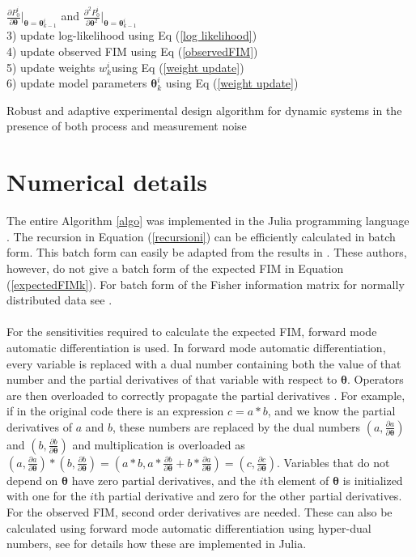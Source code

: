 \begin{algorithm}[H]
{{			$\frac{\partial P_0^i}{\partial \bm \theta}\Bigr|_{\bm \theta = \bm \theta_{k-1}^i}$ and
			$\frac{\partial^2 P_0^i}{\partial \bm \theta^2}\Bigr|_{\bm \theta = \bm \theta_{k-1}^i}$\\
			3) update log-likelihood using Eq (\ref{log likelihood})\\
			4) update observed FIM using Eq (\ref{observedFIM})\\
			5) update weights $w_k^i$using Eq (\ref{weight update})\\
			6) update model parameters $\bm \theta_k^i$ using Eq (\ref{weight update})}
	}
	\caption{Robust and adaptive experimental design algorithm for dynamic systems in the presence of both process and measurement noise}
	\label{algo}
\end{algorithm}
\section{Numerical details}
\label{sec:details}
The entire Algorithm \ref{algo} was implemented in the Julia programming language \parencite{bezanson}. The recursion in Equation (\ref{recursioni}) can be efficiently calculated in batch form. This batch form can easily be adapted from the results in \textcite{cavanaugh}. These authors, however, do not give a batch form of the expected FIM in Equation (\ref{expectedFIMk}). For batch form of the Fisher information matrix for normally distributed data see \textcite{fedorov}.
\\
\\
For the sensitivities required to calculate the expected FIM, forward mode automatic differentiation is used. In forward mode automatic differentiation, every variable is replaced with a dual number containing both the value of that number and the partial derivatives of that variable with respect to $\bm \theta$. Operators are then overloaded to correctly propagate the partial derivatives \parencite{griewank}. For example, if in the original code there is an expression $c=a*b$, and we know the partial derivatives of $a$ and $b$, these numbers are replaced by the dual numbers $(a,\frac{\partial a}{\partial \bm \theta})$ and $(b,\frac{\partial b}{\partial \bm \theta})$ and multiplication is overloaded as $(a,\frac{\partial a}{\partial \bm \theta})*(b,\frac{\partial b}{\partial \bm \theta})=(a*b,a*\frac{\partial b}{\partial \bm \theta} + b*\frac{\partial a}{\partial \bm \theta}) = (c,\frac{\partial c}{\partial \bm \theta})$. Variables that do not depend on $\bm \theta$ have zero partial derivatives, and the $i$th element of $\bm \theta$ is initialized with one for the $i$th partial derivative and zero for the other partial derivatives. For the observed FIM, second order derivatives are needed. These can also be calculated using forward mode automatic differentiation using hyper-dual numbers, see \textcite{revels} for details how these are implemented in Julia.
